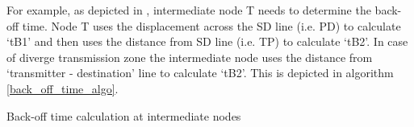 For example, as depicted in , intermediate node T needs to determine the back-off time. Node T uses the displacement across the SD line (i.e. PD) to calculate `tB1' and then uses the distance from SD line (i.e. TP) to calculate `tB2'.
In case of diverge transmission zone the intermediate node uses the distance from `transmitter - destination' line to calculate `tB2'. This is depicted in algorithm \ref{back_off_time_algo}.

\begin{algorithm}
\caption{Back-off time calculation at intermediate nodes}
\label{back_off_time_algo}
\DontPrintSemicolon
{}


\end{algorithm} 
